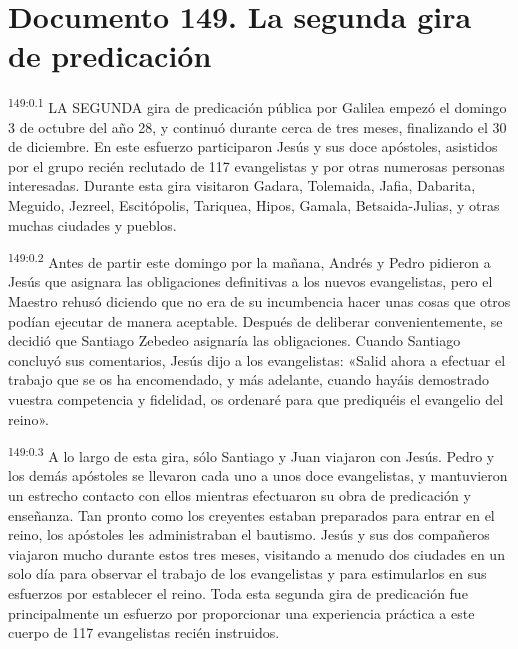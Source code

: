 \chapter{Documento 149. La segunda gira de predicación}
\par
\textsuperscript{149:0.1} LA SEGUNDA gira de predicación pública por Galilea empezó el domingo 3 de octubre del año 28, y continuó durante cerca de tres meses, finalizando el 30 de diciembre. En este esfuerzo participaron Jesús y sus doce apóstoles, asistidos por el grupo recién reclutado de 117 evangelistas y por otras numerosas personas interesadas. Durante esta gira visitaron Gadara, Tolemaida, Jafia, Dabarita, Meguido, Jezreel, Escitópolis, Tariquea, Hipos, Gamala, Betsaida-Julias, y otras muchas ciudades y pueblos.

\par
\textsuperscript{149:0.2} Antes de partir este domingo por la mañana, Andrés y Pedro pidieron a Jesús que asignara las obligaciones definitivas a los nuevos evangelistas, pero el Maestro rehusó diciendo que no era de su incumbencia hacer unas cosas que otros podían ejecutar de manera aceptable. Después de deliberar convenientemente, se decidió que Santiago Zebedeo asignaría las obligaciones. Cuando Santiago concluyó sus comentarios, Jesús dijo a los evangelistas: «Salid ahora a efectuar el trabajo que se os ha encomendado, y más adelante, cuando hayáis demostrado vuestra competencia y fidelidad, os ordenaré para que prediquéis el evangelio del reino».

\par
\textsuperscript{149:0.3} A lo largo de esta gira, sólo Santiago y Juan viajaron con Jesús. Pedro y los demás apóstoles se llevaron cada uno a unos doce evangelistas, y mantuvieron un estrecho contacto con ellos mientras efectuaron su obra de predicación y enseñanza. Tan pronto como los creyentes estaban preparados para entrar en el reino, los apóstoles les administraban el bautismo. Jesús y sus dos compañeros viajaron mucho durante estos tres meses, visitando a menudo dos ciudades en un solo día para observar el trabajo de los evangelistas y para estimularlos en sus esfuerzos por establecer el reino. Toda esta segunda gira de predicación fue principalmente un esfuerzo por proporcionar una experiencia práctica a este cuerpo de 117 evangelistas recién instruidos.


